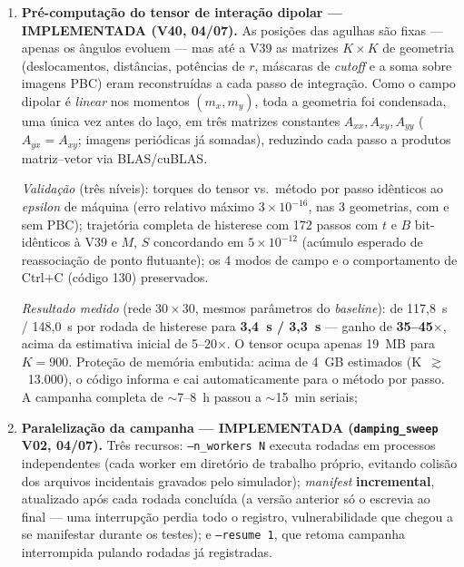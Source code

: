 \documentclass[11pt,a4paper]{article}
\newcommand{\code}[1]{\texttt{#1}}
\begin{document}
\begin{enumerate}
\item \textbf{Pré-computação do tensor de interação dipolar ---
IMPLEMENTADA (V40, 04/07).} As posições das agulhas são fixas --- apenas
os ângulos evoluem --- mas até a V39 as matrizes $K \times K$ de
geometria (deslocamentos, distâncias, potências de $r$, máscaras de
\emph{cutoff} e a soma sobre imagens PBC) eram reconstruídas a cada
passo de integração. Como o campo dipolar é \emph{linear} nos momentos
$(m_x, m_y)$, toda a geometria foi condensada, uma única vez antes do
laço, em três matrizes constantes $A_{xx}, A_{xy}, A_{yy}$
($A_{yx} = A_{xy}$; imagens periódicas já somadas), reduzindo cada passo
a produtos matriz--vetor via BLAS/cuBLAS.

\emph{Validação} (três níveis): torques do tensor vs.\ método por passo
idênticos ao \emph{epsilon} de máquina (erro relativo máximo
$3 \times 10^{-16}$, nas 3 geometrias, com e sem PBC); trajetória
completa de histerese com 172 passos com $t$ e $B$ bit-idênticos à V39 e
$M$, $S$ concordando em $5 \times 10^{-12}$ (acúmulo esperado de
reassociação de ponto flutuante); os 4 modos de campo e o comportamento
de \mbox{Ctrl+C} (código 130) preservados.

\emph{Resultado medido} (rede $30\times30$, mesmos parâmetros do
\emph{baseline}): de 117{,}8~s / 148{,}0~s por rodada de histerese para
\textbf{3{,}4~s / 3{,}3~s} --- ganho de \textbf{35--45$\times$}, acima
da estimativa inicial de 5--20$\times$. O tensor ocupa apenas 19~MB para
$K = 900$. Proteção de memória embutida: acima de 4~GB estimados
(K~$\gtrsim$~13.000), o código informa e cai automaticamente para o
método por passo. A campanha completa de $\sim$7--8~h passou a
$\sim$15~min seriais;
\item \textbf{Paralelização da campanha --- IMPLEMENTADA
(\code{damping\_sweep} V02, 04/07).} Três recursos: \code{--n\_workers~N}
executa rodadas em processos independentes (cada worker em diretório de
trabalho próprio, evitando colisão dos arquivos incidentais gravados
pelo simulador); \emph{manifest} \textbf{incremental}, atualizado após
cada rodada concluída (a versão anterior só o escrevia ao final --- uma
interrupção perdia todo o registro, vulnerabilidade que chegou a se
manifestar durante os testes); e \code{--resume~1}, que retoma campanha
interrompida pulando rodadas já registradas.


\end{enumerate}
\end{document}
